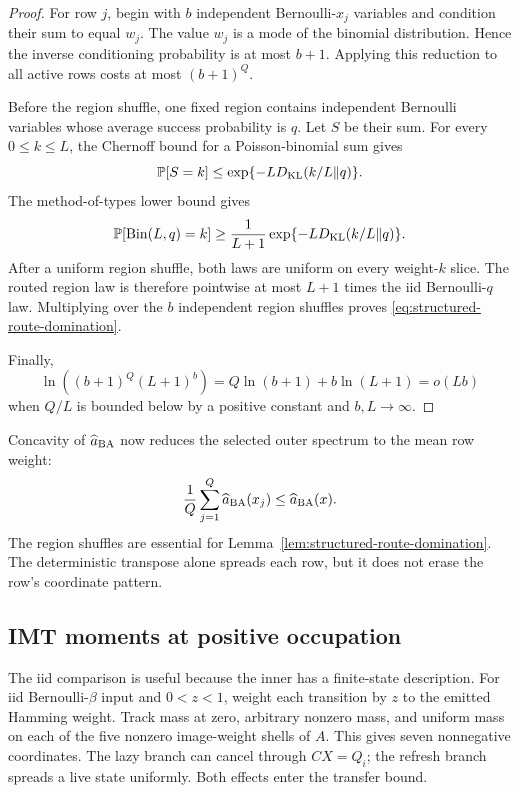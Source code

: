 \begin{proof}
For row $j$, begin with $b$ independent Bernoulli-$x_j$ variables and
condition their sum to equal $w_j$. The value $w_j$ is a mode of the
binomial distribution. Hence the inverse conditioning probability is at
most $b+1$. Applying this reduction to all active rows costs at most
$(b+1)^Q$.

Before the region shuffle, one fixed region contains independent Bernoulli
variables whose average success probability is $q$. Let $S$ be their sum.
For every $0\le k\le L$, the Chernoff bound for a Poisson-binomial sum gives
\[
  \mathbb P[S=k]
  \le
  \exp\{-L D_{\rm KL}(k/L\Vert q)\}.
\]
The method-of-types lower bound gives
\[
  \mathbb P[\operatorname{Bin}(L,q)=k]
  \ge
  \frac1{L+1}
  \exp\{-L D_{\rm KL}(k/L\Vert q)\}.
\]
After a uniform region shuffle, both laws are uniform on every weight-$k$
slice. The routed region law is therefore pointwise at most $L+1$ times the
iid Bernoulli-$q$ law. Multiplying over the $b$ independent region shuffles
proves \eqref{eq:structured-route-domination}.

Finally,
\[
  \ln((b+1)^Q(L+1)^b)
  =Q\ln(b+1)+b\ln(L+1)=o(Lb)
\]
when $Q/L$ is bounded below by a positive constant and $b,L\to\infty$.
\end{proof}

Concavity of $\widehat a_{\rm BA}$ now reduces the selected outer spectrum
to the mean row weight:
\begin{equation}
  \frac1Q\sum_{j=1}^Q\widehat a_{\rm BA}(x_j)
  \le
  \widehat a_{\rm BA}(x).
  \label{eq:structured-ba-jensen}
\end{equation}
The region shuffles are essential for Lemma~\ref{lem:structured-route-domination}.
The deterministic transpose alone spreads each row, but it does not erase
the row's coordinate pattern.

\subsection{IMT moments at positive occupation}

The iid comparison is useful because the inner has a finite-state
description. For iid Bernoulli-$\beta$ input and $0<z<1$, weight each
transition by $z$ to the emitted Hamming weight. Track mass at zero,
arbitrary nonzero mass, and uniform mass on each of the five nonzero
image-weight shells of $A$. This gives seven nonnegative coordinates.
The lazy branch can cancel through $CX=Q_i$; the refresh branch spreads
a live state uniformly. Both effects enter the transfer bound.

